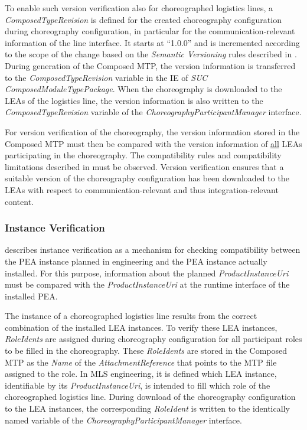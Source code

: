 To enable such version verification also for choreographed logistics lines, a \emph{ComposedTypeRevision} is defined for the created choreography configuration during choreography configuration, in particular for the communication-relevant information of the line interface. It starts at \enquote{1.0.0} and is incremented according to the scope of the change based on the \emph{Semantic Versioning} rules described in \cite{PNO.2025.Part1}. During generation of the Composed MTP, the version information is transferred to the \emph{ComposedTypeRevision} variable in the IE of \emph{SUC ComposedModuleTypePackage}. When the choreography is downloaded to the LEAs of the logistics line, the version information is also written to the \emph{ComposedTypeRevision} variable of the \emph{ChoreographyParticipantManager} interface.

For version verification of the choreography, the version information stored in the Composed MTP must then be compared with the version information of \underline{all} LEAs participating in the choreography. The compatibility rules and compatibility limitations described in \cite{PNO.2025.Part1} must be observed. Version verification ensures that a suitable version of the choreography configuration has been downloaded to the LEAs with respect to communication-relevant and thus integration-relevant content.

\subsubsection{Instance Verification}

\cite{PNO.2025.Part1} describes instance verification as a mechanism for checking compatibility between the PEA instance planned in engineering and the PEA instance actually installed. For this purpose, information about the planned \emph{ProductInstanceUri} must be compared with the \emph{ProductInstanceUri} at the runtime interface of the installed PEA.

The instance of a choreographed logistics line results from the correct combination of the installed LEA instances. To verify these LEA instances, \emph{Role\-Idents} are assigned during choreography configuration for all participant roles to be filled in the choreography. These \emph{RoleIdents} are stored in the Composed MTP as the \emph{Name} of the \emph{AttachmentReference} that points to the MTP file assigned to the role. In MLS engineering, it is defined which LEA instance, identifiable by its \emph{ProductInstance\-Uri}, is intended to fill which role of the choreographed logistics line. During download of the choreography configuration to the LEA instances, the corresponding \emph{RoleIdent} is written to the identically named variable of the \emph{ChoreographyParticipantManager} interface. 

